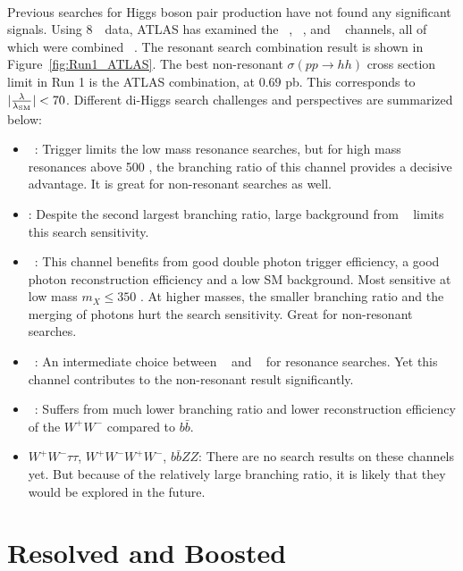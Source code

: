 \paragraph{}
Previous searches for Higgs boson pair production have not found any significant signals. 
Using 8~\TeV\ data, ATLAS has examined the \bbbb~\cite{Aad:2015uka}, \bbgg~\cite{HIGG-2013-29}, \bbtautau and \WWgg~ channels, all of which were combined ~\cite{Aad:2015xja}. 
The resonant search combination result is shown in Figure~\ref{fig:Run1_ATLAS}. 
The best non-resonant $\sigma(pp \to hh)$ cross section limit in Run 1 is the ATLAS combination, at $0.69$ pb. This corresponds to $|\frac{\rm \lambda}{\rm \lambda_{\rm SM}}| <70$. 
Different di-Higgs search challenges and perspectives are summarized below:
\begin{itemize}
	\item \bbbb~: Trigger limits the low mass resonance searches, but for high mass resonances above 500 \GeV, the branching ratio of this channel provides a decisive advantage. It is great for non-resonant searches as well.
	\item \bbWW: Despite the second largest branching ratio, large background from \ttbar~ limits this search sensitivity.
	\item \bbgg~: This channel benefits from good double photon trigger efficiency, a good photon reconstruction efficiency and a low SM background. Most sensitive at low mass $m_{X} \leq 350$ \GeV. At higher masses, the smaller branching ratio and the merging of photons hurt the search sensitivity. Great for non-resonant searches.
	\item \bbtautau~: An intermediate choice between \bbbb~ and \bbgg~ for resonance searches. Yet this channel contributes to the non-resonant result significantly.
	\item \WWgg~: Suffers from much lower branching ratio and lower reconstruction efficiency of the $W^+W^-$ compared to $b\bar{b}$.
	\item $W^+W^-\tau\tau$, $W^+W^-W^+W^-$, $b\bar{b}ZZ$: There are no search results on these channels yet. But because of the relatively large branching ratio, it is likely that they would be explored in the future.
\end{itemize}

\section{Resolved and Boosted}

